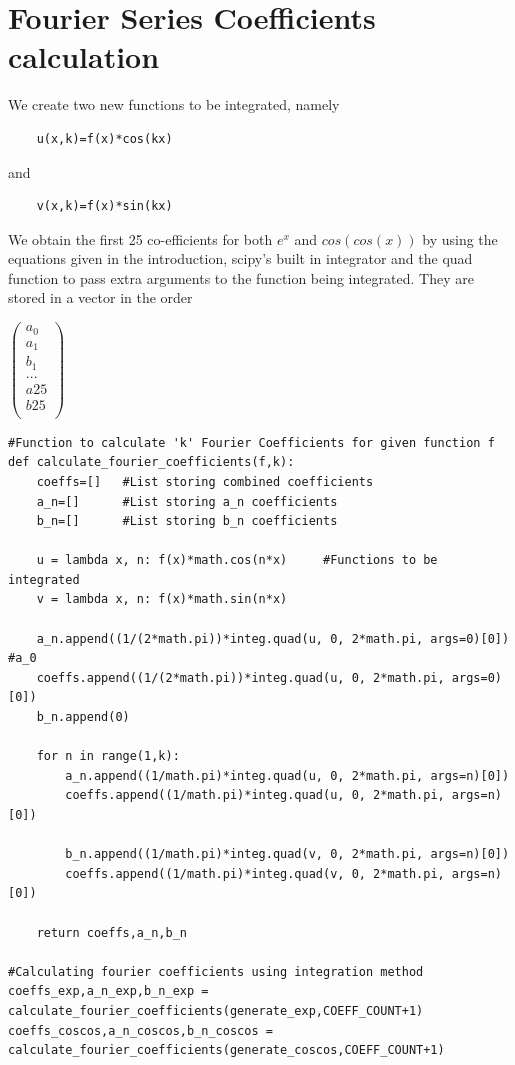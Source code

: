 \documentclass[11pt, a4paper]{article}
\begin{document}
\section{Fourier Series Coefficients calculation}
\par We create two new functions to be integrated, namely \begin{verbatim}
    u(x,k)=f(x)*cos(kx)
\end{verbatim} and
\begin{verbatim}
    v(x,k)=f(x)*sin(kx)
\end{verbatim}
We obtain the first 25 co-efficients for both $e^x$ and $cos(cos(x))$ by using the equations given in the introduction, scipy’s built in integrator and the quad function to pass extra arguments to the function being integrated. They are stored in a vector in the order
\begin{center}
     $
    \begin{pmatrix}
    a_0\\
    a_1\\
    b_1\\
    ...\\
    a25\\
    b25\\
    \end{pmatrix}
     $
    
\end{center}
\begin{lstlisting}
#Function to calculate 'k' Fourier Coefficients for given function f
def calculate_fourier_coefficients(f,k):                       
    coeffs=[]   #List storing combined coefficients
    a_n=[]      #List storing a_n coefficients
    b_n=[]      #List storing b_n coefficients
                            
    u = lambda x, n: f(x)*math.cos(n*x)     #Functions to be integrated
    v = lambda x, n: f(x)*math.sin(n*x)
                                                                        
    a_n.append((1/(2*math.pi))*integ.quad(u, 0, 2*math.pi, args=0)[0])      #a_0
    coeffs.append((1/(2*math.pi))*integ.quad(u, 0, 2*math.pi, args=0)[0])
    b_n.append(0) 

    for n in range(1,k):
        a_n.append((1/math.pi)*integ.quad(u, 0, 2*math.pi, args=n)[0])    
        coeffs.append((1/math.pi)*integ.quad(u, 0, 2*math.pi, args=n)[0])
        
        b_n.append((1/math.pi)*integ.quad(v, 0, 2*math.pi, args=n)[0])   
        coeffs.append((1/math.pi)*integ.quad(v, 0, 2*math.pi, args=n)[0]) 
    
    return coeffs,a_n,b_n

#Calculating fourier coefficients using integration method
coeffs_exp,a_n_exp,b_n_exp = calculate_fourier_coefficients(generate_exp,COEFF_COUNT+1)
coeffs_coscos,a_n_coscos,b_n_coscos = calculate_fourier_coefficients(generate_coscos,COEFF_COUNT+1)
\end{lstlisting}
\end{document}
